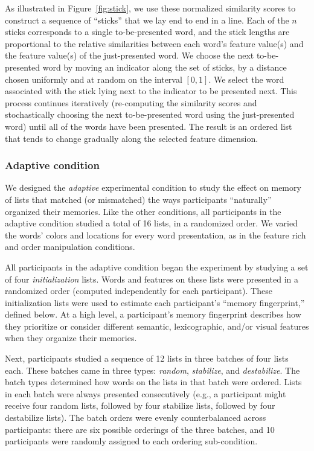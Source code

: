 \documentclass[11pt]{article}
\begin{document}
As illustrated in Figure~\ref{fig:stick}, we use these normalized similarity
scores to construct a sequence of ``sticks'' that we lay end to end in a line.
Each of the $n$ sticks corresponds to a single to-be-presented word, and the
stick lengths are proportional to the relative similarities between each word's
feature value(s) and the feature value(s) of the just-presented word. We choose
the next to-be-presented word by moving an indicator along the set of sticks,
by a distance chosen uniformly and at random on the interval $\left[0,
1\right]$. We select the word associated with the stick lying next to the
indicator to be presented next. This process continues iteratively
(re-computing the similarity scores and stochastically choosing the next
to-be-presented word using the just-presented word) until all of the words have
been presented. The result is an ordered list that tends to change gradually
along the selected feature dimension.

\subsubsection*{Adaptive condition}

We designed the \textit{adaptive} experimental condition to study the effect on
memory of lists that matched (or mismatched) the ways participants
``naturally'' organized their memories. Like the other conditions, all
participants in the adaptive condition studied a total of 16 lists, in a
randomized order. We varied the words' colors and locations for every word
presentation, as in the feature rich and order manipulation conditions.

All participants in the adaptive condition began the experiment by studying a
set of four \textit{initialization} lists. Words and features on these lists
were presented in a randomized order (computed independently for each
participant). These initialization lists were used to estimate each
participant's ``memory fingerprint,'' defined below. At a high level, a
participant's memory fingerprint describes how they prioritize or consider
different semantic, lexicographic, and/or visual features when they organize
their memories.

Next, participants studied a sequence of 12 lists in three batches of four
lists each. These batches came in three types: \textit{random},
\textit{stabilize}, and \textit{destabilize}. The batch types determined how
words on the lists in that batch were ordered. Lists in each batch were always
presented consecutively (e.g., a participant might receive four random lists,
followed by four stabilize lists, followed by four destabilize lists). The
batch orders were evenly counterbalanced across participants: there are six
possible orderings of the three batches, and 10 participants were randomly
assigned to each ordering sub-condition.
\end{document}
